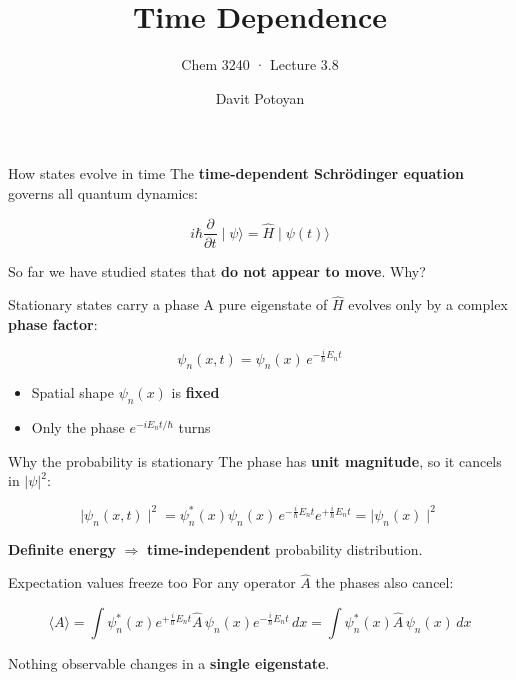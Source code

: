 \documentclass[
  ignorenonframetext,
  aspectratio=169,
  handout]{beamer}
\title{\texorpdfstring{Time Dependence}{Time Dependence}}
\subtitle{\texorpdfstring{Chem 3240 · Lecture
3.8}{Chem 3240 · Lecture 3.8}}
\author{Davit Potoyan}
\date{}
\providecommand{\tightlist}{%
  \setlength{\itemsep}{0pt}\setlength{\parskip}{0pt}}
\begin{document}
\frame{\titlepage}


\begin{frame}
\begin{block}{How states evolve in time}
\protect{}\label{how-states-evolve-in-time}
The \textbf{time-dependent Schrödinger equation} governs all quantum
dynamics:

\[ i\hbar\frac{\partial}{\partial t}\mid \psi \rangle =\hat{H}\mid\psi(t)\rangle \]

So far we have studied states that \textbf{do not appear to move}. Why?
\end{block}

\begin{block}{Stationary states carry a phase}
\protect{}\label{stationary-states-carry-a-phase}
A pure eigenstate of \(\hat{H}\) evolves only by a complex \textbf{phase
factor}:

\[\psi_n(x,t) = \psi_n(x)\, e^{-\frac{i}{\hbar}E_n t}\]

\begin{itemize}
\tightlist
\item
  Spatial shape \(\psi_n(x)\) is \textbf{fixed}
\item
  Only the phase \(e^{-iE_n t/\hbar}\) turns
\end{itemize}
\end{block}

\begin{block}{Why the probability is stationary}
\protect{}\label{why-the-probability-is-stationary}
The phase has \textbf{unit magnitude}, so it cancels in \(|\psi|^2\):

\[\mid \psi_n(x,t) \mid^2 = \psi_n^*(x)\psi_n(x)\, e^{-\frac{i}{\hbar}E_n t} e^{+\frac{i}{\hbar}E_n t} = \mid \psi_n(x) \mid^2\]

\textbf{Definite energy} \(\Rightarrow\) \textbf{time-independent}
probability distribution.
\end{block}

\begin{block}{Expectation values freeze too}
\protect{}\label{expectation-values-freeze-too}
For any operator \(\hat{A}\) the phases also cancel:

\[\langle A \rangle = \int \psi_n^*(x) e^{+\frac{i}{\hbar}E_n t} \hat{A}\, \psi_n(x) e^{-\frac{i}{\hbar}E_n t}\, dx = \int \psi_n^*(x) \hat{A}\, \psi_n(x)\, dx\]

Nothing observable changes in a \textbf{single eigenstate}.
\end{block}


\end{frame}
\end{document}
